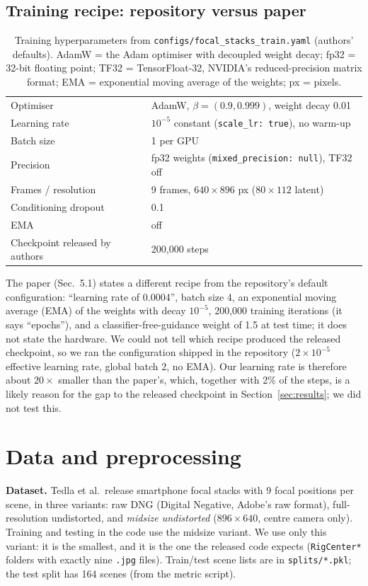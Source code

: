 \documentclass[11pt]{article}
\begin{document}
\subsection{Training recipe: repository versus paper}\label{sec:recipe}
\begin{table}[htbp]\centering
\caption{Training hyperparameters from \texttt{configs/focal\_stacks\_train.yaml} (authors' defaults). AdamW = the Adam optimiser with decoupled weight decay; fp32 = 32-bit floating point; TF32 = TensorFloat-32, NVIDIA's reduced-precision matrix format; EMA = exponential moving average of the weights; px = pixels.}\label{tab:hparams}
\begin{tabular}{ll}\toprule
Optimiser & AdamW, $\beta=(0.9,0.999)$, weight decay 0.01\\
Learning rate & $10^{-5}$ constant (\texttt{scale\_lr: true}), no warm-up\\
Batch size & 1 per GPU\\
Precision & fp32 weights (\texttt{mixed\_precision: null}), TF32 off\\
Frames / resolution & 9 frames, $640\times896$ px ($80\times112$ latent)\\
Conditioning dropout & 0.1\\
EMA & off\\
Checkpoint released by authors & 200{,}000 steps\\
\bottomrule\end{tabular}
\end{table}
The paper (Sec.\ 5.1) states a different recipe from the repository's default configuration: ``learning rate of 0.0004'', batch size 4, an exponential moving average (EMA) of the weights with decay $10^{-5}$, 200{,}000 training iterations (it says ``epochs''), and a classifier-free-guidance weight of 1.5 at test time; it does not state the hardware.
We could not tell which recipe produced the released checkpoint, so we ran the configuration shipped in the repository ($2\times10^{-5}$ effective learning rate, global batch 2, no EMA).
Our learning rate is therefore about $20\times$ smaller than the paper's, which, together with 2\% of the steps, is a likely reason for the gap to the released checkpoint in Section~\ref{sec:results}; we did not test this.

\section{Data and preprocessing}\label{sec:data}
\textbf{Dataset.} Tedla et al.\ release smartphone focal stacks with 9 focal positions per scene, in three variants: raw DNG (Digital Negative, Adobe's raw format), full-resolution undistorted, and \emph{midsize undistorted} ($896\times640$, centre camera only). Training and testing in the code use the midsize variant.
We use only this variant: it is the smallest, and it is the one the released code expects (\texttt{RigCenter*} folders with exactly nine \texttt{.jpg} files).
Train/test scene lists are in \texttt{splits/*.pkl}; the test split has 164 scenes (from the metric script).
\end{document}
